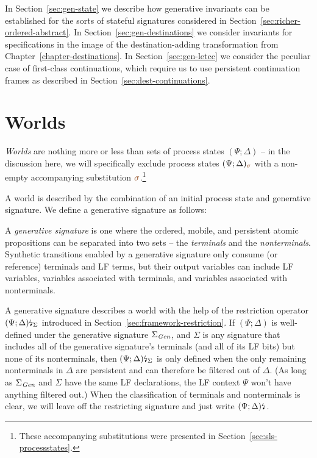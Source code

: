 In Section~\ref{sec:gen-state}
we describe how generative invariants can be established for the sorts
of stateful signatures considered in
Section~\ref{sec:richer-ordered-abstract}. In
Section~\ref{sec:gen-destinations} we consider invariants for
specifications in the image of the destination-adding transformation
from Chapter~\ref{chapter-destinations}.  In
Section~\ref{sec:gen-letcc} we consider the peculiar case of
first-class continuations, which require us to use persistent
continuation frames as described in Section~\ref{sec:dest-continuations}. 

\section{Worlds}
\label{sec:gen-worlds}

{\it Worlds} are nothing more or less than sets of process states
$(\Psi; \Delta)$ -- in the discussion here, we will specifically
exclude process states $(\Psi; \Delta)_{\lf\sigma}$ with a non-empty
accompanying substitution $\lf\sigma$.\footnote{These accompanying
  substitutions were presented in
  Section~\ref{sec:sls-processstates}.}

A world is described by the combination of an initial process state
and generative signature. We define a generative
signature as follows:

\bigskip
\begin{definition}\label{def:gensig}
  A {\em generative signature} is one where the ordered, mobile, and
  persistent atomic propositions can be separated into two sets -- the
  {\em terminals} and the {\em nonterminals}. Synthetic transitions
  enabled by a generative signature only consume (or reference) 
  terminals and LF terms, but their output variables can include
  LF variables, variables associated with terminals, and variables
  associated with nonterminals.
\end{definition}
\bigskip

\noindent
A generative signature describes a world with the help of the
restriction operator ${(\Psi; \Delta)}{\mbox{\lightning}}_{\Sigma}$ introduced
in Section~\ref{sec:framework-restriction}. If $(\Psi; \Delta)$ is
well-defined under the generative signature $\Sigma_{\it Gen}$, and
$\Sigma$ is any signature that includes all of the generative
signature's terminals (and all of its LF bits) but none of its
nonterminals, then ${(\Psi; \Delta)}{\mbox{\lightning}}_{\Sigma}$ is only
defined when the only remaining nonterminals in $\Delta$ are
persistent and can therefore be filtered out of $\Delta$. (As long as
$\Sigma_{\it Gen}$ and $\Sigma$ have the same LF declarations, the LF
context $\Psi$ won't have anything filtered out.) When the
classification of terminals and nonterminals is clear, we will leave
off the restricting signature and just write ${(\Psi;
  \Delta)}{\mbox{\lightning}}_{}$.

